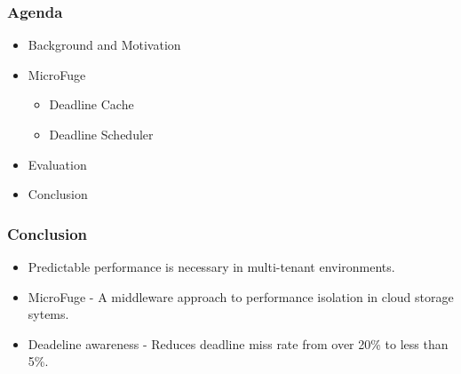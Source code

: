 \documentclass{beamer}
\begin{document}
\begin{frame}
  \frametitle{Agenda}
  \begin{itemize}
  \item[\Checkmark] Background and Motivation
  \item[\Checkmark] MicroFuge
    \begin{itemize}
    \item[\Checkmark] Deadline Cache
    \item[\Checkmark] Deadline Scheduler
    \end{itemize}
  \item[\Checkmark] Evaluation
  \item Conclusion
  \end{itemize}
\end{frame}


\begin{frame}
  \frametitle{Conclusion}
  \begin{itemize}
    \item Predictable performance is necessary in multi-tenant environments.
    \item MicroFuge - A middleware approach to performance isolation in cloud
      storage sytems.
    \item Deadeline awareness - Reduces deadline miss rate from over 20\% to
      less than 5\%.
  \end{itemize}
\end{frame}
\end{document}
